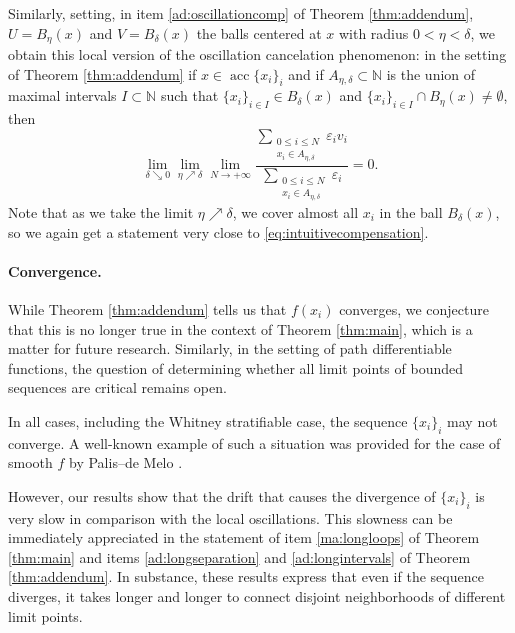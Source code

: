 \documentclass[11pt]{article}
\theoremstyle{definition}
\theoremstyle{remark}
\DeclareMathOperator{\acc}{acc}
\newcommand{\N}{\mathbb{N}}
\renewcommand{\leq}{\leqslant}
\begin{document}
Similarly, setting, in item \ref{ad:oscillationcomp} of Theorem \ref{thm:addendum}, $U=B_{\eta}(x)$ and $V=B_{\delta}(x)$ the balls centered at $x $ with radius $0<\eta<\delta$, we obtain this  local version of the oscillation cancelation phenomenon: in the setting of Theorem \ref{thm:addendum} if $x\in\acc\{x_i\}_i$ and if $A_{\eta,\delta}\subset\N$ is the union of maximal intervals $I\subset \N$ such that $\{x_i\}_{i\in I}\in B_\delta(x)$ and $\{x_i\}_{i\in I}\cap B_\eta(x)\neq\emptyset$, then
\[\lim_{\delta\searrow 0}\lim_{\eta\nearrow\delta}\lim_{N\to+\infty} \frac{\displaystyle\sum_{\substack{0\leq i\leq N\\x_i\in A_{\eta,\delta}}}\varepsilon_iv_i}{\displaystyle\sum_{\substack{0\leq i\leq N\\x_i\in A_{\eta,\delta}}}\varepsilon_i}=0.\]
Note that as we take the limit $\eta\nearrow\delta$, we cover almost all $x_i$ in the ball $B_\delta(x)$, so we again get a statement very close to \eqref{eq:intuitivecompensation}. 

%

%
\paragraph{Convergence.}
While Theorem \ref{thm:addendum} tells us that $f(x_i)$ converges, we conjecture that this is no longer true in the context of Theorem \ref{thm:main}, which is a matter for future research. Similarly, in the setting of path differentiable functions, the question of determining whether all limit points of bounded sequences are critical remains open.

In all cases, including the Whitney stratifiable case, the sequence $\{x_i\}_i$ may not converge. A well-known example of such a situation was provided for the case of smooth $f$  by Palis--de Melo \cite{palisdemelo}.

However, our results show that the drift that causes the divergence of $\{x_i\}_i$ is very slow in comparison with the local oscillations. This slowness can be immediately appreciated in the statement of item \ref{ma:longloops} of Theorem \ref{thm:main} and items \ref{ad:longseparation} and \ref{ad:longintervals} of Theorem \ref{thm:addendum}. In substance, these results express that even if the sequence diverges, it takes longer and longer to connect disjoint neighborhoods of different limit points.

%


%
\end{document}
